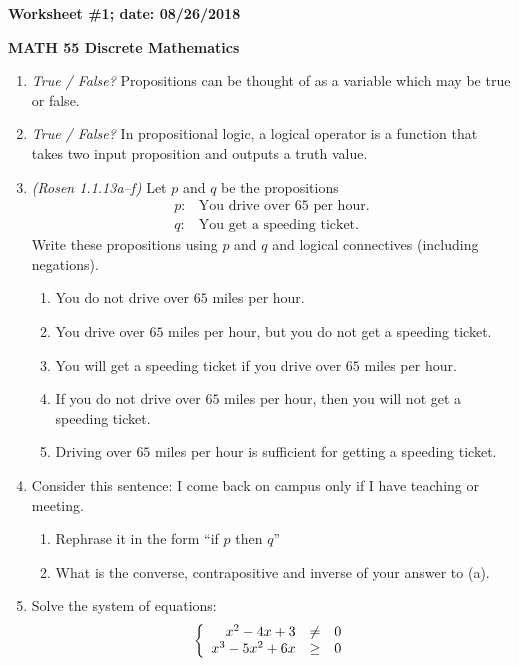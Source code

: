 \documentclass{article}
\begin{document}
{\bf Worksheet \#1; date: 08/26/2018}

{\bf MATH 55 Discrete Mathematics}

\begin{enumerate}
\item {\em True / False?} Propositions can be thought of as a variable which may be true or false.

\item {\em True / False?} In propositional logic, a logical operator is a function that takes two input proposition and outputs a truth value.

\item {\em (Rosen 1.1.13a--f)} Let $p$ and $q$ be the propositions
\begin{align*}
p: & \text{You drive over $65$ per hour.} \\
q: & \text{You get a speeding ticket.}
\end{align*}
Write these propositions using $p$ and $q$ and logical connectives (including negations).
\begin{enumerate}
\item You do not drive over $65$ miles per hour.
\item You drive over $65$ miles per hour, but you do not get a speeding ticket.
\item You will get a speeding ticket if you drive over $65$ miles per hour.
\item If you do not drive over $65$ miles per hour, then you will not get a speeding ticket.
\item Driving over $65$ miles per hour is sufficient for getting a speeding ticket.
\end{enumerate}

\item Consider this sentence: I come back on campus only if I have teaching or meeting.
\begin{enumerate}
\item Rephrase it in the form ``if $p$ then $q$''
\item What is the converse, contrapositive and inverse of your answer to (a).
\end{enumerate}

\item Solve the system of equations:
\[
	\left\{\begin{array}{r c l}
	x^2 - 4x + 3 & \ne & 0 \\
	x^3 - 5x^2 + 6x & \ge & 0
	\end{array}\right.
\]


\end{enumerate}
\end{document}
